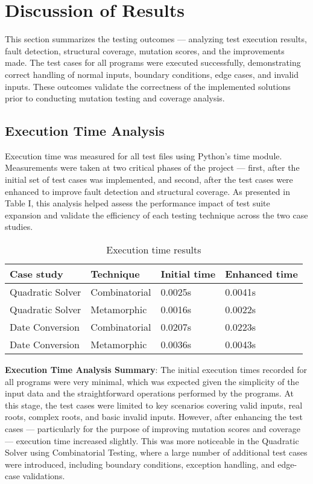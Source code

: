 \documentclass[conference]{IEEEtran}
\begin{document}
\section{Discussion of Results}
This section summarizes the testing outcomes — analyzing test execution results, fault detection, structural coverage, mutation scores, and the improvements made. The test cases for all programs were executed successfully, demonstrating correct handling of normal inputs, boundary conditions, edge cases, and invalid inputs. These outcomes validate the correctness of the implemented solutions prior to conducting mutation testing and coverage analysis.

\subsection{Execution Time Analysis}
Execution time was measured for all test files using Python's time module. Measurements were taken at two critical phases of the project — first, after the initial set of test cases was implemented, and second, after the test cases were enhanced to improve fault detection and structural coverage. As presented in Table I, this analysis helped assess the performance impact of test suite expansion and validate the efficiency of each testing technique across the two case studies.

\begin{table}[htbp]
\caption{Execution time results}
\centering
\begin{tabular}{|l|l|l|l|}
\hline
Case study & Technique & Initial time & Enhanced time \\
\hline
Quadratic Solver & Combinatorial & 0.0025s & 0.0041s \\
Quadratic Solver & Metamorphic   & 0.0016s & 0.0022s \\
Date Conversion  & Combinatorial & 0.0207s & 0.0223s \\
Date Conversion  & Metamorphic   & 0.0036s & 0.0043s \\
\hline
\end{tabular}
\end{table}    
    

\textbf{Execution Time Analysis Summary}:
The initial execution times recorded for all programs were very minimal, which was expected given the simplicity of the input data and the straightforward operations performed by the programs. At this stage, the test cases were limited to key scenarios covering valid inputs, real roots, complex roots, and basic invalid inputs. However, after enhancing the test cases --- particularly for the purpose of improving mutation scores and coverage --- execution time increased slightly. This was more noticeable in the Quadratic Solver using Combinatorial Testing, where a large number of additional test cases were introduced, including boundary conditions, exception handling, and edge-case validations.
\end{document}
